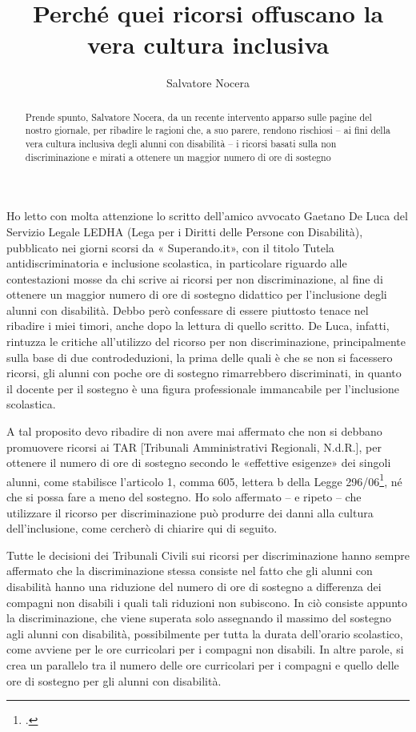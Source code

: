 \author{Salvatore Nocera}
\title{Perché quei ricorsi offuscano la vera cultura inclusiva}
\label{cha:salvatorenocera210114}
\begin{abstract}
Prende spunto, Salvatore Nocera, da un recente intervento apparso sulle pagine del nostro giornale, per ribadire le ragioni che, a suo parere, rendono rischiosi – ai fini della vera cultura inclusiva degli alunni con disabilità – i ricorsi basati sulla non discriminazione e mirati a ottenere un maggior numero di ore di sostegno
\end{abstract}
\maketitle
{}
Ho letto con molta attenzione lo scritto dell'amico avvocato Gaetano De Luca del Servizio Legale LEDHA (Lega per i Diritti delle Persone con Disabilità), pubblicato nei giorni scorsi da « Superando.it», con il titolo Tutela antidiscriminatoria e inclusione scolastica, in particolare riguardo alle contestazioni mosse da chi scrive ai ricorsi per non discriminazione, al fine di ottenere un maggior numero di ore di sostegno didattico per l'inclusione degli alunni con disabilità.
Debbo però confessare di essere piuttosto tenace nel ribadire i miei timori, anche dopo la lettura di quello scritto. De Luca, infatti, rintuzza le critiche all'utilizzo del ricorso per non discriminazione, principalmente sulla base di due controdeduzioni, la prima delle quali è che se non si facessero ricorsi, gli alunni con poche ore di sostegno rimarrebbero discriminati, in quanto il docente per il sostegno è una figura professionale immancabile per l'inclusione scolastica.

A tal proposito devo ribadire di non avere mai affermato che non si debbano promuovere ricorsi ai TAR [Tribunali Amministrativi Regionali, N.d.R.], per ottenere il numero di ore di sostegno secondo le «effettive esigenze» dei singoli alunni, come stabilisce l'articolo 1, comma 605, lettera b della Legge 296/06\footcite{Legge_296_2006}, né che si possa fare a meno del sostegno. Ho solo affermato – e ripeto – che utilizzare il ricorso per discriminazione può produrre dei danni alla cultura dell'inclusione, come cercherò di chiarire qui di seguito.

Tutte le decisioni dei Tribunali Civili sui ricorsi per discriminazione hanno sempre affermato che la discriminazione stessa consiste nel fatto che gli alunni con disabilità hanno una riduzione del numero di ore di sostegno a differenza dei compagni non disabili i quali tali riduzioni non subiscono. In ciò consiste appunto la discriminazione, che viene superata solo assegnando il massimo del sostegno agli alunni con disabilità, possibilmente per tutta la durata dell'orario scolastico, come avviene per le ore curricolari per i compagni non disabili. In altre parole, si crea un parallelo tra il numero delle ore curricolari per i compagni e quello delle ore di sostegno per gli alunni con disabilità.

